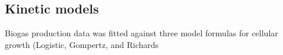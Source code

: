\subsection{Kinetic models}
Biogas production data was fitted against three model formulas for cellular growth (Logistic, Gompertz, and Richards